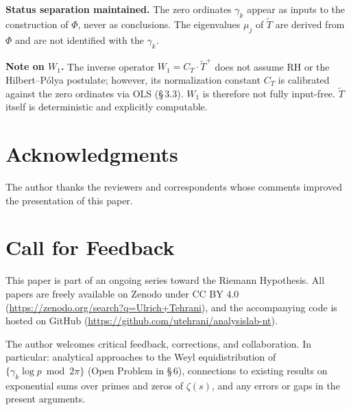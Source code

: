 \documentclass[11pt]{article}
\newcommand{\Tt}{\widetilde{T}}
\newcommand{\CT}{C_{T}}
\newcommand{\Wone}{W_1}
\begin{document}
\textbf{Status separation maintained.}
The zero ordinates $\gamma_k$ appear as inputs to the construction
of $\Phi$, never as conclusions. The eigenvalues $\mu_j$ of $\Tt$
are derived from $\Phi$ and are not identified with the $\gamma_k$.

\textbf{Note on $\Wone$.}
The inverse operator $\Wone = \CT\cdot\Tt^+$ does not assume RH or
the Hilbert--P\'olya postulate; however, its normalization constant
$\CT$ is calibrated against the zero ordinates via OLS (\S\,3.3).
$\Wone$ is therefore not fully input-free. $\Tt$ itself is
deterministic and explicitly computable.

\section*{Acknowledgments}

The author thanks the reviewers and correspondents whose
comments improved the presentation of this paper.

\section*{Call for Feedback}

This paper is part of an ongoing series toward the Riemann Hypothesis.
All papers are freely available on Zenodo under CC BY 4.0
(\url{https://zenodo.org/search?q=Ulrich+Tehrani}),
and the accompanying code is hosted on GitHub
(\url{https://github.com/utehrani/analysislab-nt}).

The author welcomes critical feedback, corrections, and collaboration.
In particular: analytical approaches to the Weyl equidistribution
of $\{\gamma_k\log p\bmod 2\pi\}$ (Open Problem in \S\,6),
connections to existing results on exponential sums
over primes and zeros of $\zeta(s)$,
and any errors or gaps in the present arguments.
\end{document}
